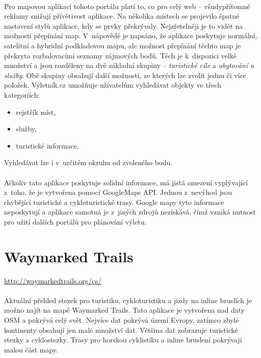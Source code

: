 \documentclass[11pt,a4paper,titlepage,oneside]{book}
\begin{document}
		\paragraph{} Pro mapovou aplikaci tohoto portálu platí to, co pro celý web -- všudy\-přítomné reklamy snižují přívětivost aplikace. Na několika místech se projevilo špatné nastavení stylů aplikace, kdy se prvky překrývaly. Nejzřetelněji je to vidět na možnosti přepínání map. V~nápovědě\cite{vyletnik} je napsáno, že aplikace poskytuje normální, satelitní a hybridní podkladovou mapu, ale možnost přepínání těchto map je překryta rozbalovacími seznamy zájmových bodů. Těch je k~dispozici velké množství a jsou rozděleny na dvě základní skupiny -- \textit{turistické cíle} a \textit{ubytování a služby}. Obě skupiny obsahují další možnosti, ze kterých lze zvolit jednu či více položek. Výletník.cz umožňuje uživatelům vyhledávat objekty ve třech kategoriích:
			\begin{itemize}
				\item rejstřík míst,
				\item služby,
				\item turistické informace.
			\end{itemize}
Vyhledávat lze i v~určitém okruhu od zvoleného bodu.
		\paragraph{} Ačkoliv tato aplikace poskytuje solidní informace, má jistá omezení vyplý\-vající z~toho, že je vytvořena pomocí GoogleMaps \ac{API}. Jednou z~nevýhod jsou chybějící turistické a cykloturistické trasy. Google mapy tyto informace neposkytují a aplikace samotná je z~jiných zdrojů nezískává, čímž vzniká nutnost pro užití dalších portálů pro plánování výletu.	
	
	\section{Waymarked Trails}
		\label{sec:waymarked}
		\url{http://waymarkedtrails.org/cs/}


		\paragraph{} Aktuální přehled stezek pro turistiku, cykloturistiku a jízdy na inline bruslích je možno najít na mapě Waymarked Trails\cite{Waymarked}. Tato aplikace je vytvořena nad daty \ac{OSM} a pokrývá celý svět. Nejvíce dat pokrývá území Evropy, zatímco zbylé kontinenty  obsahují jen malé množství dat. Většina dat zobrazuje turistické stezky a cyklostezky. Trasy pro horskou cyklistiku a inline bruslení pokrývají malou část mapy.
\end{document}
